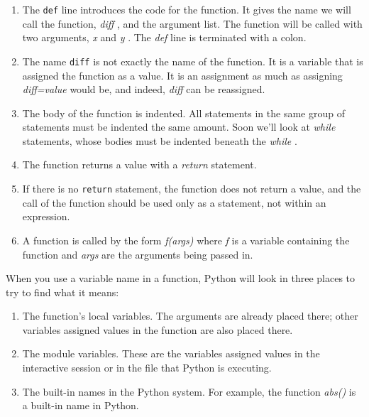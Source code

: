 \begin{enumerate}

\item
  The \texttt{def} line introduces
  the code for the function. It gives the name we will call the
  function, \emph{diff} , and the argument list. The function will be
  called with two arguments, \emph{x} and \emph{y} . The \emph{def} line
  is terminated with a colon.
\item
  The name \texttt{diff} is not
  exactly the name of the function. It is a variable that is assigned
  the function as a value. It is an assignment as much as assigning
  \emph{diff=value} would be, and indeed, \emph{diff} can be reassigned.
\item
  The body of the function is
  indented. All statements in the same group of statements must be
  indented the same amount. Soon we'll look at \emph{while} statements,
  whose bodies must be indented beneath the \emph{while} .
\item
  The function returns a value with a \emph{return} statement.
\item
  If there is no \texttt{return} statement, the function does not return a value, and the call of the
  function should be used only as a statement, not within an expression.
\item
  A function is called by the form
  \emph{f(args)} where \emph{f} is a variable containing the function
  and \emph{args} are the arguments being passed in.
\end{enumerate}

When you use a variable name in a
function, Python will look in three places to try to find what it means:

\begin{enumerate}

\item
  The function's local variables.
  The arguments are already placed there; other variables assigned
  values in the function are also placed there.
\item
  The module variables. These are
  the variables assigned values in the interactive session or in the
  file that Python is executing.
\item
  The built-in names in the Python
  system. For example, the function \emph{abs()} is a built-in name in
  Python.
\end{enumerate}

